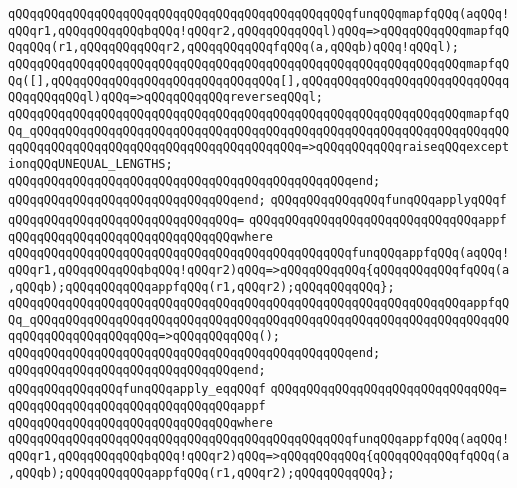 \verb|qQQqqQQqqQQqqQQqqQQqqQQqqQQqqQQqqQQqqQQqqQQqqQQqfunqQQqmapfqQQq(aqQQq!qQQqr1,qQQqqQQqqQQqbqQQq!qQQqr2,qQQqqQQqqQQql)qQQq=>qQQqqQQqqQQqmapfqQQqqQQq(r1,qQQqqQQqqQQqr2,qQQqqQQqqQQqfqQQq(a,qQQqb)qQQq!qQQql);|\newline
\verb|qQQqqQQqqQQqqQQqqQQqqQQqqQQqqQQqqQQqqQQqqQQqqQQqqQQqqQQqqQQqqQQqmapfqQQq([],qQQqqQQqqQQqqQQqqQQqqQQqqQQqqQQq[],qQQqqQQqqQQqqQQqqQQqqQQqqQQqqQQqqQQqqQQql)qQQq=>qQQqqQQqqQQqreverseqQQql;|\newline
\verb|qQQqqQQqqQQqqQQqqQQqqQQqqQQqqQQqqQQqqQQqqQQqqQQqqQQqqQQqqQQqqQQqmapfqQQq_qQQqqQQqqQQqqQQqqQQqqQQqqQQqqQQqqQQqqQQqqQQqqQQqqQQqqQQqqQQqqQQqqQQqqQQqqQQqqQQqqQQqqQQqqQQqqQQqqQQqqQQqqQQq=>qQQqqQQqqQQqraiseqQQqexceptionqQQqUNEQUAL_LENGTHS;|\newline
\verb|qQQqqQQqqQQqqQQqqQQqqQQqqQQqqQQqqQQqqQQqqQQqqQQqend;|\newline
\verb|qQQqqQQqqQQqqQQqqQQqqQQqqQQqqQQqend;|\newline
\newline
\verb|qQQqqQQqqQQqqQQqfunqQQqapplyqQQqf|\newline
\verb|qQQqqQQqqQQqqQQqqQQqqQQqqQQqqQQq=|\newline
\verb|qQQqqQQqqQQqqQQqqQQqqQQqqQQqqQQqappf|\newline
\verb|qQQqqQQqqQQqqQQqqQQqqQQqqQQqqQQqwhere|\newline
\verb|qQQqqQQqqQQqqQQqqQQqqQQqqQQqqQQqqQQqqQQqqQQqqQQqfunqQQqappfqQQq(aqQQq!qQQqr1,qQQqqQQqqQQqbqQQq!qQQqr2)qQQq=>qQQqqQQqqQQq{qQQqqQQqqQQqfqQQq(a,qQQqb);qQQqqQQqqQQqappfqQQq(r1,qQQqr2);qQQqqQQqqQQq};|\newline
\verb|qQQqqQQqqQQqqQQqqQQqqQQqqQQqqQQqqQQqqQQqqQQqqQQqqQQqqQQqqQQqqQQqappfqQQq_qQQqqQQqqQQqqQQqqQQqqQQqqQQqqQQqqQQqqQQqqQQqqQQqqQQqqQQqqQQqqQQqqQQqqQQqqQQqqQQqqQQqqQQq=>qQQqqQQqqQQq();|\newline
\verb|qQQqqQQqqQQqqQQqqQQqqQQqqQQqqQQqqQQqqQQqqQQqqQQqend;|\newline
\verb|qQQqqQQqqQQqqQQqqQQqqQQqqQQqqQQqend;|\newline
\newline
\verb|qQQqqQQqqQQqqQQqfunqQQqapply_eqqQQqf|\newline
\verb|qQQqqQQqqQQqqQQqqQQqqQQqqQQqqQQq=|\newline
\verb|qQQqqQQqqQQqqQQqqQQqqQQqqQQqqQQqappf|\newline
\verb|qQQqqQQqqQQqqQQqqQQqqQQqqQQqqQQqwhere|\newline
\verb|qQQqqQQqqQQqqQQqqQQqqQQqqQQqqQQqqQQqqQQqqQQqqQQqfunqQQqappfqQQq(aqQQq!qQQqr1,qQQqqQQqqQQqbqQQq!qQQqr2)qQQq=>qQQqqQQqqQQq{qQQqqQQqqQQqfqQQq(a,qQQqb);qQQqqQQqqQQqappfqQQq(r1,qQQqr2);qQQqqQQqqQQq};|\newline

